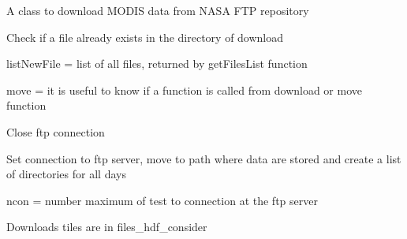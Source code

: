 \documentclass[a4paper,11pt,oneside]{sphinxmanual}
\begin{document}
\begin{fulllineitems}
\label{pymodis/pymodis:pymodis.downmodis.downModis}
A class to download MODIS data from NASA FTP repository

\begin{fulllineitems}
\label{pymodis/pymodis:pymodis.downmodis.downModis.checkDataExist}
Check if a file already exists in the directory of download

listNewFile = list of all files, returned by getFilesList function

move = it is useful to know if a function is called from download or move function

\end{fulllineitems}


\begin{fulllineitems}
\label{pymodis/pymodis:pymodis.downmodis.downModis.closeFTP}
Close ftp connection

\end{fulllineitems}


\begin{fulllineitems}
\label{pymodis/pymodis:pymodis.downmodis.downModis.connectFTP}
Set connection to ftp server, move to path where data are stored
and create a list of directories for all days

ncon = number maximum of test to connection at the ftp server

\end{fulllineitems}


\begin{fulllineitems}
\label{pymodis/pymodis:pymodis.downmodis.downModis.dayDownload}
Downloads tiles are in files\_hdf\_consider


\end{fulllineitems}
\end{fulllineitems}
\end{document}
